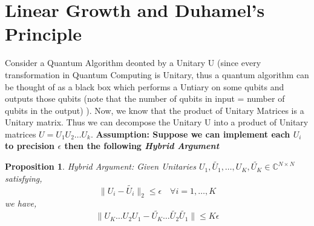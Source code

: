 \documentclass[12pt, oneside]{book}
\newtheorem{proposition}[theorem]{Proposition}
\theoremstyle{definition}
\theoremstyle{definition}
\theoremstyle{remark}
\begin{document}
\section{Linear Growth and Duhamel's Principle}
Consider a Quantum Algorithm deonted by a Unitary U (since every
transformation in Quantum Computing is Unitary, thus a quantum algorithm can be thought of as a black box
which performs a Untiary on some qubits and outputs those qubits (note that the number
of qubits in input = number of qubits in the output) ). Now,
we know that the product of Unitary Matrices is a Unitary matrix. Thus we
can decompose the Unitary U into a product of Unitary matrices $U=U_1U_2\ldots U_k$.
\textbf{Assumption: Suppose we can implement each $U_i$ to precision $\epsilon$ then the following \textit{Hybrid Argument}}
\begin{proposition}
    Hybrid Argument: Given Unitaries $U_1,\tilde{U_1},\ldots,U_K,\tilde{U_K} \in \mathbb{C}^{N \times N}$
    satisfying,
    \[\|U_i-\tilde{U_i}\|_2 \leq \epsilon \quad \forall i=1,\ldots,K\]
    we have,
    \[\|U_K\ldots U_2 U_1 - \tilde{U_K}\ldots \tilde{U_2}\tilde{U_1}\| \leq K\epsilon\]
\end{proposition}
\end{document}
